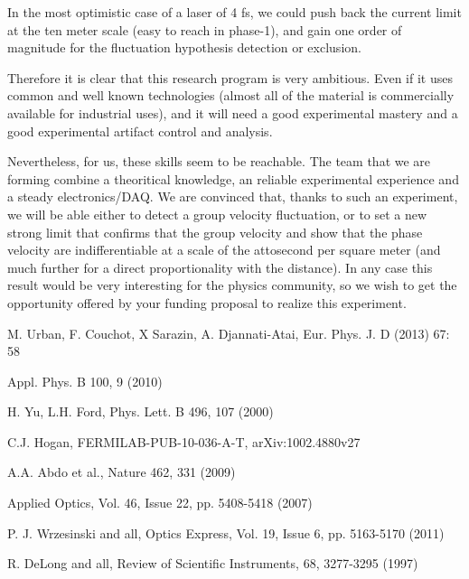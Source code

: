 \documentclass[9pt, a4, twoside]{article}
\begin{document}
In the most optimistic case of a laser of 4 fs, we could push back the current limit at the ten meter scale (easy to reach in phase-1), and gain one order of magnitude for the fluctuation hypothesis detection or exclusion.

Therefore  it is clear that this research program is very ambitious. Even if it  uses common and well known technologies (almost all of the material is  commercially available for industrial uses), and it will need a good  experimental mastery and a good experimental artifact control and  analysis.

Nevertheless,  for us, these skills seem to be reachable. The team that we are forming combine a theoritical knowledge, an reliable experimental experience and a steady electronics/DAQ. We are convinced that, thanks to such an experiment, we will be able either to detect a group velocity  fluctuation, or to set a new strong limit that confirms that the group  velocity and show that the phase velocity are indifferentiable at a  scale of the attosecond per square meter (and much further for a direct  proportionality with the distance). In any case this result would be  very interesting for the physics community, so we wish to get the  opportunity offered by your funding proposal to realize this  experiment.



\begin{thebibliography}{9}
 
 M. Urban, F. Couchot, X Sarazin, A. Djannati-Atai, Eur. Phys. J. D (2013) 67: 58
 
 
 Appl. Phys. B 100, 9 (2010)

 H. Yu, L.H. Ford, Phys. Lett. B 496, 107 (2000)
 
 C.J. Hogan, FERMILAB-PUB-10-036-A-T, arXiv:1002.4880v27
 
 A.A. Abdo et al., Nature 462, 331 (2009)
 
 Applied Optics, Vol. 46, Issue 22, pp. 5408-5418 (2007)
 
 P. J. Wrzesinski and all, Optics Express, Vol. 19, Issue 6, pp. 5163-5170 (2011)
 
 R. DeLong and all, Review of Scientific Instruments, 68, 3277-3295 (1997)
 
\end{thebibliography}
\end{document}
